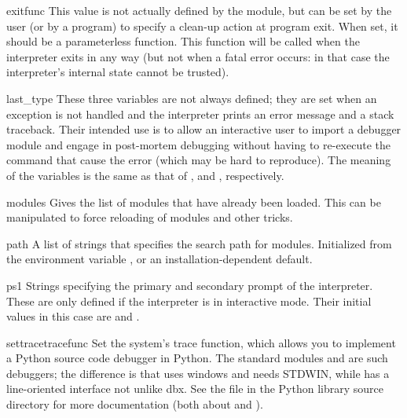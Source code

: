 \begin{datadesc}{exitfunc}
  This value is not actually defined by the module, but can be set by
  the user (or by a program) to specify a clean-up action at program
  exit.  When set, it should be a parameterless function.  This function
  will be called when the interpreter exits in any way (but not when a
  fatal error occurs: in that case the interpreter's internal state
  cannot be trusted).
\end{datadesc}

\begin{datadesc}{last_type}
  These three variables are not always defined; they are set when an
  exception is not handled and the interpreter prints an error message
  and a stack traceback.  Their intended use is to allow an interactive
  user to import a debugger module and engage in post-mortem debugging
  without having to re-execute the command that cause the error (which
  may be hard to reproduce).  The meaning of the variables is the same
  as that of ,  and ,
  respectively.
\end{datadesc}

\begin{datadesc}{modules}
  Gives the list of modules that have already been loaded.
  This can be manipulated to force reloading of modules and other tricks.
\end{datadesc}

\begin{datadesc}{path}
  A list of strings that specifies the search path for modules.
  Initialized from the environment variable , or an
  installation-dependent default.
\end{datadesc}

\begin{datadesc}{ps1}
  Strings specifying the primary and secondary prompt of the
  interpreter.  These are only defined if the interpreter is in
  interactive mode.  Their initial values in this case are
   and .
\end{datadesc}

\begin{funcdesc}{settrace}{tracefunc}
  Set the system's trace function, which allows you to implement a
  Python source code debugger in Python.  The standard modules
   and  are such debuggers; the difference is that
   uses windows and needs STDWIN, while  has a
  line-oriented interface not unlike dbx.  See the file 
  in the Python library source directory for more documentation (both
  about  and ).
\end{funcdesc}

